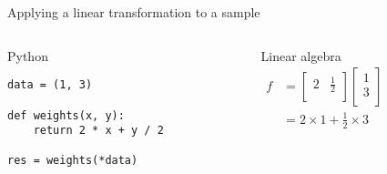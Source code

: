 \begin{frame}[fragile]{Applying a linear transformation to a sample}
  \begin{columns}
    \begin{column}{0.5\textwidth}
      Python
\begin{verbatim}
data = (1, 3)

def weights(x, y):
    return 2 * x + y / 2

res = weights(*data)
\end{verbatim}
    \end{column}
    \begin{column}{0.5\textwidth}
      Linear algebra\\[.3cm]

      \(
      \begin{aligned}
        f & = \begin{bmatrix}
          2 & \frac{1}{2} \\
        \end{bmatrix}
        \begin{bmatrix}
          1 \\
          3 \\
        \end{bmatrix} \\
        & = 2 \times 1 + \frac{1}{2} \times 3
      \end{aligned}
      \)
    \end{column}
  \end{columns}
\end{frame}

